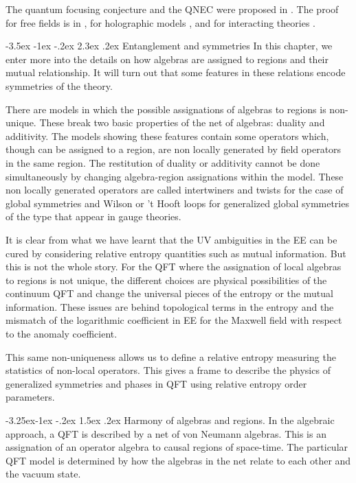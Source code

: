 \documentclass[11pt]{article}
\makeatletter
\renewcommand\section{\@startsection {section}{1}{\z@}%
                                 {-3.5ex \@plus -1ex \@minus -.2ex}%
                                   {2.3ex \@plus.2ex}%
                                   {\normalfont\large\bfseries}}
\renewcommand\subsection{\@startsection{subsection}{2}{\z@}%
                                   {-3.25ex\@plus -1ex \@minus -.2ex}%
                                     {1.5ex \@plus .2ex}%
                                     {\normalfont\bfseries}}
\numberwithin{equation}{section}
\makeatother
\begin{document}
The quantum focusing conjecture and the QNEC were proposed in \cite{Bousso:2015mna}. The proof for free fields is in \cite{Bousso:2015wca}, for holographic models  \cite{Koeller:2015qmn,Leichenauer:2018obf}, and for interacting theories \cite{Balakrishnan:2017bjg,Balakrishnan:2019gxl}. 
 
\newpage

\section{Entanglement and symmetries}
In this chapter, we enter more into the details on how algebras are assigned to regions and their mutual relationship. It will turn out that some features in these relations encode symmetries of the theory.  

There are models in which the possible assignations of algebras to regions is non-unique. These break two basic properties of the net of algebras: duality and additivity. The models showing these features contain some operators which, though can be assigned to a region, are non locally generated by field operators in the same region.  The restitution of duality or additivity cannot be done simultaneously by changing algebra-region assignations within the model. These non locally generated operators are called intertwiners and twists for the case of global symmetries and Wilson or 't Hooft loops for generalized global symmetries of the type that appear in gauge theories.

It is clear from what we have learnt that the UV ambiguities in the EE can be cured by considering relative entropy quantities such as mutual information. But this is not the whole story. For the QFT where the assignation of local algebras to regions is not unique, the different choices are physical possibilities of the continuum QFT and change the universal pieces of the entropy or the mutual information. These issues are behind topological terms in the entropy and the mismatch of the logarithmic coefficient in EE for the Maxwell field with respect to the anomaly coefficient. 

This same non-uniqueness allows us to define a relative entropy measuring the statistics of non-local operators. This gives a frame to describe the physics of generalized symmetries and phases in QFT using relative entropy order parameters. 
 

\subsection{Harmony of algebras and regions. }
In the algebraic approach, a QFT is described by a net of von Neumann algebras. This is an assignation of an operator algebra to causal regions of space-time. The particular QFT model is determined by how the algebras in the net relate to each other and the vacuum state.
\end{document}
